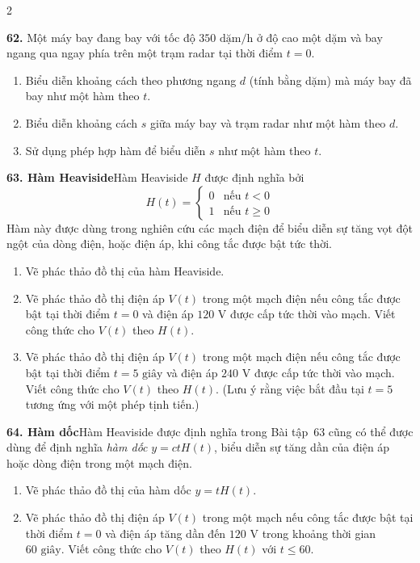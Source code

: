 \fancyhead{}

\begin{multicols}{2}
\fontsize{8.5pt}{10.8pt}\selectfont
\setlength{\abovedisplayskip}{2pt}
\setlength{\belowdisplayskip}{2pt}

\noindent
\textbf{62.} Một máy bay đang bay với tốc độ $350\text{ dặm/h}$ ở độ cao một dặm và bay ngang qua ngay phía trên một trạm radar tại thời điểm $t = 0$.
\begin{enumerate}[label=(\alph*),leftmargin=*,itemsep=1pt,topsep=2pt]
    \item Biểu diễn khoảng cách theo phương ngang $d$ (tính bằng dặm) mà máy bay đã bay như một hàm theo $t$.
    \item Biểu diễn khoảng cách $s$ giữa máy bay và trạm radar như một hàm theo $d$.
    \item Sử dụng phép hợp hàm để biểu diễn $s$ như một hàm theo $t$.
\end{enumerate}

\noindent
\textbf{63. Hàm Heaviside}\quad Hàm Heaviside $H$ được định nghĩa bởi
\[
H(t) = \begin{cases} 
0 & \text{nếu } t < 0 \\ 
1 & \text{nếu } t \ge 0 
\end{cases}
\]
Hàm này được dùng trong nghiên cứu các mạch điện để biểu diễn sự tăng vọt đột ngột của dòng điện, hoặc điện áp, khi công tắc được bật tức thời.
\begin{enumerate}[label=(\alph*),leftmargin=*,itemsep=1pt,topsep=2pt]
    \item Vẽ phác thảo đồ thị của hàm Heaviside.
    \item Vẽ phác thảo đồ thị điện áp $V(t)$ trong một mạch điện nếu công tắc được bật tại thời điểm $t = 0$ và điện áp $120\text{ V}$ được cấp tức thời vào mạch. Viết công thức cho $V(t)$ theo $H(t)$.
    \item Vẽ phác thảo đồ thị điện áp $V(t)$ trong một mạch điện nếu công tắc được bật tại thời điểm $t = 5\text{ giây}$ và điện áp $240\text{ V}$ được cấp tức thời vào mạch. Viết công thức cho $V(t)$ theo $H(t)$. (Lưu ý rằng việc bắt đầu tại $t = 5$ tương ứng với một phép tịnh tiến.)
\end{enumerate}

\noindent
\textbf{64. Hàm dốc}\quad Hàm Heaviside được định nghĩa trong Bài tập~63 cũng có thể được dùng để định nghĩa \textit{hàm dốc} $y = ctH(t)$, biểu diễn sự tăng dần của điện áp hoặc dòng điện trong một mạch điện.
\begin{enumerate}[label=(\alph*),leftmargin=*,itemsep=1pt,topsep=2pt]
    \item Vẽ phác thảo đồ thị của hàm dốc $y = tH(t)$.
    \item Vẽ phác thảo đồ thị điện áp $V(t)$ trong một mạch nếu công tắc được bật tại thời điểm $t = 0$ và điện áp tăng dần đến $120\text{ V}$ trong khoảng thời gian $60\text{ giây}$. Viết công thức cho $V(t)$ theo $H(t)$ với $t \leqslant 60$.
\end{enumerate}


\end{multicols}
